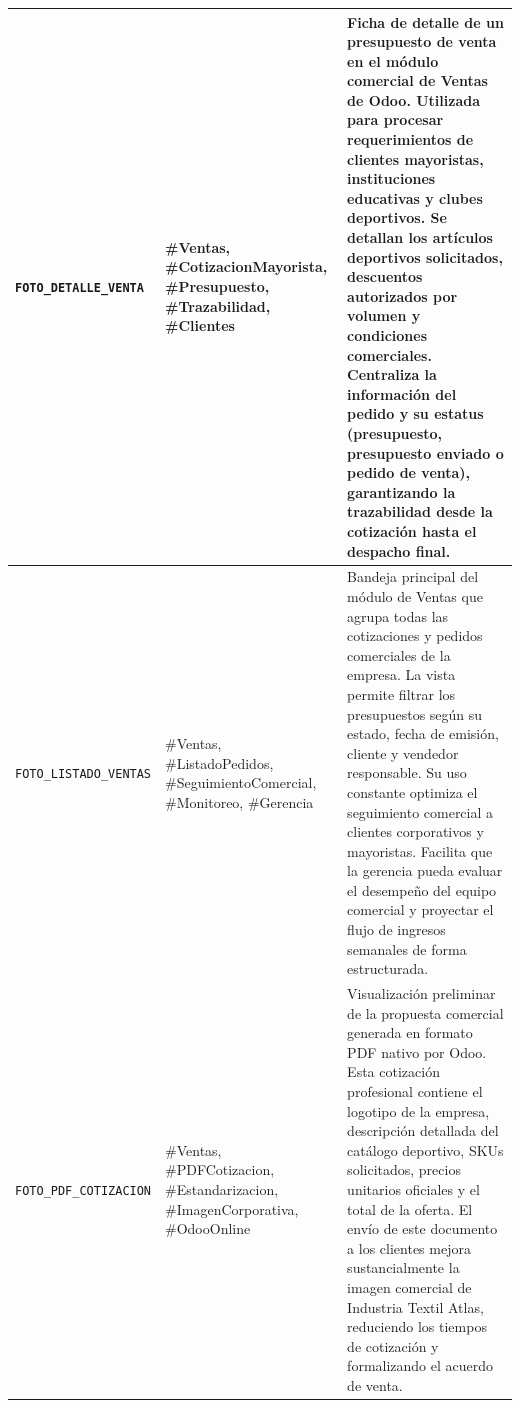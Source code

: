 \documentclass[11pt,a4paper]{article}
\begin{document}
\begin{longtable}{|>{\centering\arraybackslash}m{}|>{\RaggedRight\arraybackslash}m{}|>{\RaggedRight\arraybackslash}m{}|}
\texttt{FOTO\_DETALLE\_VENTA}
&
\#Ventas, \#CotizacionMayorista, \#Presupuesto, \#Trazabilidad, \#Clientes
&
Ficha de detalle de un presupuesto de venta en el módulo comercial de Ventas de Odoo. Utilizada para procesar requerimientos de clientes mayoristas, instituciones educativas y clubes deportivos. Se detallan los artículos deportivos solicitados, descuentos autorizados por volumen y condiciones comerciales. Centraliza la información del pedido y su estatus (presupuesto, presupuesto enviado o pedido de venta), garantizando la trazabilidad desde la cotización hasta el despacho final.
\\ \hline

\texttt{FOTO\_LISTADO\_VENTAS}
&
\#Ventas, \#ListadoPedidos, \#SeguimientoComercial, \#Monitoreo, \#Gerencia
&
Bandeja principal del módulo de Ventas que agrupa todas las cotizaciones y pedidos comerciales de la empresa. La vista permite filtrar los presupuestos según su estado, fecha de emisión, cliente y vendedor responsable. Su uso constante optimiza el seguimiento comercial a clientes corporativos y mayoristas. Facilita que la gerencia pueda evaluar el desempeño del equipo comercial y proyectar el flujo de ingresos semanales de forma estructurada.
\\ \hline

\texttt{FOTO\_PDF\_COTIZACION}
&
\#Ventas, \#PDFCotizacion, \#Estandarizacion, \#ImagenCorporativa, \#OdooOnline
&
Visualización preliminar de la propuesta comercial generada en formato PDF nativo por Odoo. Esta cotización profesional contiene el logotipo de la empresa, descripción detallada del catálogo deportivo, SKUs solicitados, precios unitarios oficiales y el total de la oferta. El envío de este documento a los clientes mejora sustancialmente la imagen comercial de Industria Textil Atlas, reduciendo los tiempos de cotización y formalizando el acuerdo de venta.
\\ \hline

\end{longtable}
\end{document}
